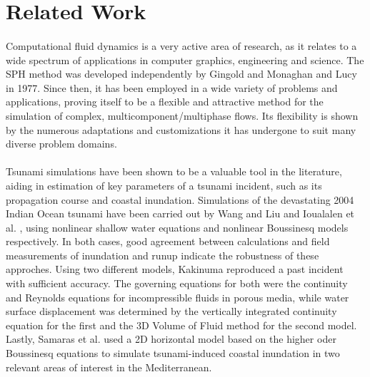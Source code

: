\documentclass{llncs}
\begin{document}
\section{Related Work}

\paragraph{} Computational fluid dynamics is a very active area of research, as it relates
to a wide spectrum of applications in computer graphics, engineering and science. The SPH
method was developed independently by Gingold and Monaghan \cite{gingold1977375} and Lucy
\cite{lucy19771013} in 1977. Since then, it has been employed in a wide variety of
problems and applications, proving itself to be a flexible and attractive method for the
simulation of complex, multicomponent/multiphase flows. Its flexibility is shown by the
numerous adaptations and customizations it has undergone to suit many diverse problem
domains.

\paragraph{} Tsunami simulations have been shown to be a valuable tool in the literature,
aiding in estimation of key parameters of a tsunami incident, such as its propagation
course and coastal inundation. Simulations of the devastating 2004 Indian Ocean tsunami
have been carried out by Wang and Liu \cite{wang2007} and Ioualalen et
al. \cite{ioualalen2007}, using nonlinear shallow water equations and nonlinear Boussinesq
models respectively. In both cases, good agreement between calculations and field
measurements of inundation and runup indicate the robustness of these approches. Using two
different models, Kakinuma \cite{kakinuma2008} reproduced a past incident with sufficient
accuracy. The governing equations for both were the continuity and Reynolds equations for
incompressible fluids in porous media, while water surface displacement was determined by
the vertically integrated continuity equation for the first and the 3D Volume of Fluid
method for the second model. Lastly, Samaras et al. \cite{samaras2015} used a 2D
horizontal model based on the higher oder Boussinesq equations to simulate tsunami-induced
coastal inundation in two relevant areas of interest in the Mediterranean.
\end{document}
